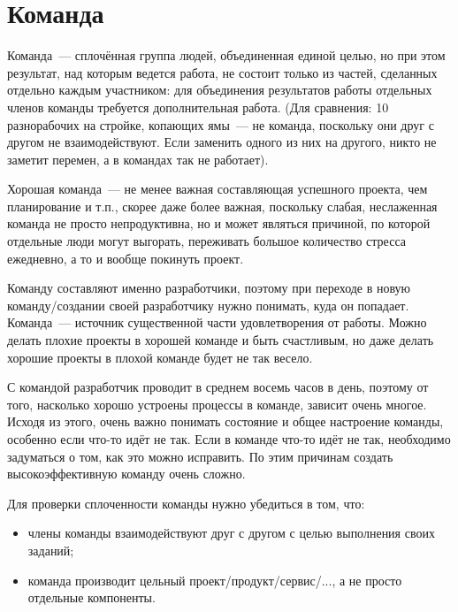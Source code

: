 \documentclass{../../text-style}
\begin{document}
\maketitle
\thispagestyle{empty}


\section{Команда}

Команда~--- сплочённая группа людей, объединенная единой целью, но при этом результат, над которым ведется работа, не состоит только из частей, сделанных отдельно каждым участником: для объединения результатов работы отдельных членов команды требуется дополнительная работа. (Для сравнения: 10 разнорабочих на стройке, копающих ямы~--- не команда, поскольку они друг с другом не взаимодействуют. Если заменить одного из них на другого, никто не заметит перемен, а в командах так не работает).

Хорошая команда~--- не менее важная составляющая успешного проекта, чем планирование и т.п., скорее даже более важная, поскольку слабая, неслаженная команда не просто непродуктивна, но и может являться причиной, по которой отдельные люди могут выгорать, переживать большое количество стресса ежедневно, а то и вообще покинуть проект.

Команду составляют именно разработчики, поэтому при переходе в новую команду/создании своей разработчику нужно понимать, куда он попадает. Команда~--- источник существенной части удовлетворения от работы. Можно делать плохие проекты в хорошей команде и быть счастливым, но даже делать хорошие проекты в плохой команде будет не так весело.

С командой разработчик проводит в среднем восемь часов в день, поэтому от того, насколько хорошо устроены процессы в команде, зависит очень многое. Исходя из этого, очень важно понимать состояние и общее настроение команды, особенно если что-то идёт не так. Если в команде что-то идёт не так, необходимо задуматься о том, как это можно исправить. По этим причинам создать высокоэффективную команду очень сложно.

Для проверки сплоченности команды нужно убедиться в том, что:

\begin{itemize}
    \item члены команды взаимодействуют друг с другом с целью выполнения своих заданий;
    \item команда производит цельный проект/продукт/сервис/..., а не просто отдельные компоненты.
\end{itemize}
\end{document}
